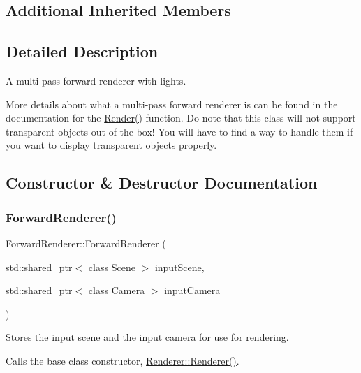 \subsection*{Additional Inherited Members}


\subsection{Detailed Description}
A multi-\/pass forward renderer with lights.

More details about what a multi-\/pass forward renderer is can be found in the documentation for the \hyperlink{class_forward_renderer_a1a5deafa5deaf1e0abaab0e2074928c1}{Render()} function. Do note that this class will not support transparent objects out of the box! You will have to find a way to handle them if you want to display transparent objects properly.

\subsection{Constructor \& Destructor Documentation}
\hypertarget{class_forward_renderer_af8ed84e45085c4dc60d565fcc3c198d1}{}\label{class_forward_renderer_af8ed84e45085c4dc60d565fcc3c198d1}
\subsubsection{\texorpdfstring{Forward\+Renderer()}{ForwardRenderer()}}
{\footnotesize\ttfamily Forward\+Renderer\+::\+Forward\+Renderer (\begin{DoxyParamCaption}\item[{std\+::shared\+\_\+ptr$<$ class \hyperlink{class_scene}{Scene} $>$}]{input\+Scene,  }\item[{std\+::shared\+\_\+ptr$<$ class \hyperlink{class_camera}{Camera} $>$}]{input\+Camera }\end{DoxyParamCaption})}



Stores the input scene and the input camera for use for rendering.

Calls the base class constructor, \hyperlink{class_renderer_adc8ce31cd649bdf220ca8355809b1d06}{Renderer\+::\+Renderer()}. \hypertarget{class_forward_renderer_ab27ea6139730631d79488cec3c564597}{}\label{class_forward_renderer_ab27ea6139730631d79488cec3c564597}
